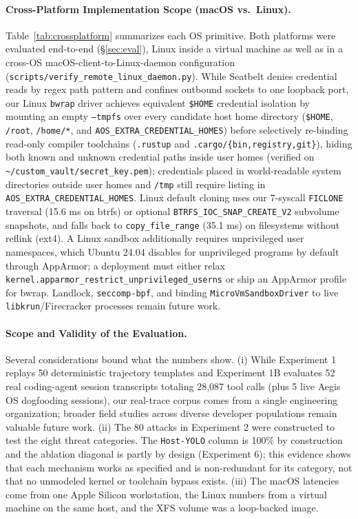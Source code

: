 \documentclass[acmsmall,screen,review]{acmart}
\begin{document}
\paragraph{Cross-Platform Implementation Scope (macOS vs.\ Linux).} Table~\ref{tab:crossplatform} summarizes each OS primitive. Both platforms were evaluated end-to-end (\S\ref{sec:eval}), Linux inside a virtual machine as well as in a cross-OS macOS-client-to-Linux-daemon configuration (\texttt{scripts/verify\_remote\_linux\_daemon.py}). While Seatbelt denies credential reads by regex path pattern and confines outbound sockets to one loopback port, our Linux \texttt{bwrap} driver achieves equivalent \texttt{\$HOME} credential isolation by mounting an empty \texttt{--tmpfs} over every candidate host home directory (\texttt{\$HOME}, \texttt{/root}, \texttt{/home/*}, and \texttt{AOS\_EXTRA\_CREDENTIAL\_HOMES}) before selectively re-binding read-only compiler toolchains (\texttt{.rustup} and \texttt{.cargo/\{bin,registry,git\}}), hiding both known and unknown credential paths inside user homes (verified on \texttt{\textasciitilde/custom\_vault/secret\_key.pem}); credentials placed in world-readable system directories outside user homes and \texttt{/tmp} still require listing in \texttt{AOS\_EXTRA\_CREDENTIAL\_HOMES}. Linux default cloning uses our 7-syscall \texttt{FICLONE} traversal (15.6 ms on btrfs) or optional \texttt{BTRFS\_IOC\_SNAP\_CREATE\_V2} subvolume snapshots, and falls back to \texttt{copy\_file\_range} (35.1 ms) on filesystems without reflink (ext4). A Linux sandbox additionally requires unprivileged user namespaces, which Ubuntu 24.04 disables for unprivileged programs by default through AppArmor; a deployment must either relax \texttt{kernel.apparmor\_restrict\_unprivileged\_userns} or ship an AppArmor profile for bwrap. Landlock, \texttt{seccomp-bpf}, and binding \texttt{MicroVmSandboxDriver} to live \texttt{libkrun}/Firecracker processes remain future work.

\paragraph{Scope and Validity of the Evaluation.} Several considerations bound what the numbers show. (i) While Experiment 1 replays 50 deterministic trajectory templates and Experiment 1B evaluates 52 real coding-agent session transcripts totaling 28,087 tool calls (plus 5 live Aegis OS dogfooding sessions), our real-trace corpus comes from a single engineering organization; broader field studies across diverse developer populations remain valuable future work. (ii) The 80 attacks in Experiment 2 were constructed to test the eight threat categories. The \texttt{Host-YOLO} column is 100\% by construction and the ablation diagonal is partly by design (Experiment 6); this evidence shows that each mechanism works as specified and is non-redundant for its category, not that no unmodeled kernel or toolchain bypass exists. (iii) The macOS latencies come from one Apple Silicon workstation, the Linux numbers from a virtual machine on the same host, and the XFS volume was a loop-backed image.
\end{document}
